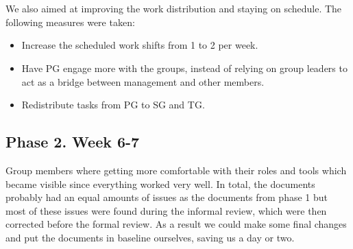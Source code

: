 \documentclass{article}
\begin{document}
        \\ \\
        We also aimed at improving the work distribution and staying on schedule. The following measures were taken:
        \begin{itemize}
            \item Increase the scheduled work shifts from 1 to 2 per week.
            \item Have PG engage more with the groups, instead of relying on group leaders to act as a 
            bridge between management and other members. 
            \item Redistribute tasks from PG to SG and TG. 
        \end{itemize}
        
    \subsection{Phase 2. Week 6-7}
        Group members where getting more comfortable with their roles and
        tools which became visible since everything worked very well. In total, the documents probably had an equal amounts of issues as the documents from phase 1 but
        most of these issues were found during the informal review, which were then corrected before the formal review.
        As a result we could make some final changes and put the documents in baseline ourselves, saving us a day or two.
        
\end{document}
